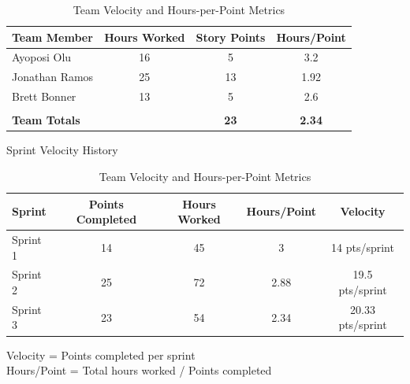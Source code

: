 \begin{table}[h]
\centering
\caption{Team Velocity and Hours-per-Point Metrics}
\begin{tabular}{|l|c|c|c|}
\hline
\textbf{Team Member} & \textbf{Hours Worked} & \textbf{Story Points} & \textbf{Hours/Point} \\
\hline
Ayoposi Olu & 16 & 5 & 3.2 \\
\hline
Jonathan Ramos & 25 & 13 & 1.92 \\
\hline
Brett Bonner & 13 & 5 & 2.6 \\
\hline
\multicolumn{4}{|c|}{} \\
\hline
\multicolumn{2}{|l|}{\textbf{Team Totals }} & \textbf{23} & \textbf{2.34} \\
\hline
\end{tabular}

\begin{center}
\small{Sprint Velocity History}
\end{center}
\begin{tabular}{|l|c|c|c|c|}
\hline
\textbf{Sprint} & \textbf{Points Completed} & \textbf{Hours Worked} & \textbf{Hours/Point} & \textbf{Velocity} \\
\hline
Sprint 1 & 14 & 45 & 3 & 14 pts/sprint \\
\hline
Sprint 2 & 25 & 72 & 2.88 & 19.5 pts/sprint \\
\hline
Sprint 3 & 23 & 54 & 2.34 & 20.33 pts/sprint \\
\hline
\end{tabular}

\vspace{0.5cm}
\begin{center}
\small{Velocity = Points completed per sprint \\
Hours/Point = Total hours worked / Points completed}
\end{center}
\end{table}
